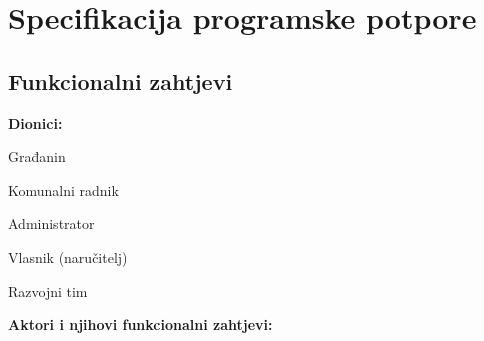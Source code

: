 \chapter{Specifikacija programske potpore}
		
	\section{Funkcionalni zahtjevi}
			
			\noindent \textbf{Dionici:}
			
			\begin{packed_enum}
				
				\item Građanin
				\item Komunalni radnik			
				\item Administrator
				\item Vlasnik (naručitelj)
				\item Razvojni tim
				
				
			\end{packed_enum}
			
			\noindent \textbf{Aktori i njihovi funkcionalni zahtjevi:}
			
